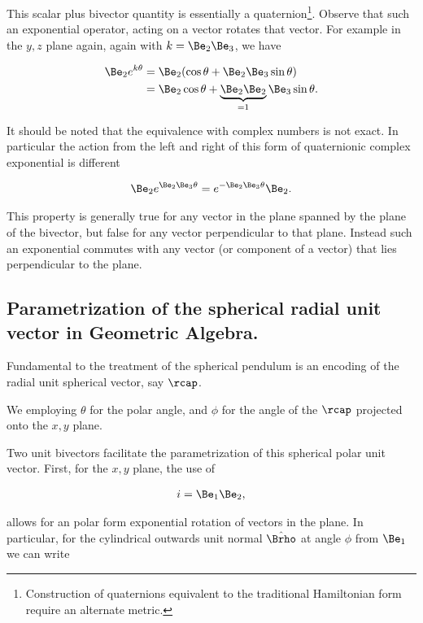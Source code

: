This scalar plus bivector quantity is essentially a quaternion\footnote{Construction of quaternions equivalent to the traditional Hamiltonian form require an alternate metric.}.  Observe that such an exponential operator, acting on a vector rotates that vector.  For example in the $y,z$ plane again, again with $k = \Be_2 \Be_3$, we have

\begin{align*}
\Be_2 e^{k \theta} 
&=
\Be_2 (\cos\theta + \Be_2 \Be_3 \sin\theta) \\
&=
\Be_2 \cos\theta + \underbrace{\Be_2 \Be_2}_{=1} \Be_3 \sin\theta.
\end{align*}

It should be noted that the equivalence with complex numbers is not exact.  In particular the action from the left and right of this form of quaternionic complex exponential is different

\begin{align}\label{eqn:mp40}
\Be_2 e^{\Be_2 \Be_3 \theta} = e^{-\Be_2 \Be_3 \theta} \Be_2.
\end{align}

This property is generally true for any vector in the plane spanned by the plane of the bivector, but false for any vector perpendicular to that plane.  Instead such an exponential commutes with any vector (or component of a vector) that lies perpendicular to the plane.

\subsection{Parametrization of the spherical radial unit vector in Geometric Algebra.}

Fundamental to the treatment of the spherical pendulum is an encoding of the radial unit spherical vector, say $\rcap$.

We employing $\theta$ for the polar angle, and $\phi$ for the angle of the $\rcap$ projected onto the $x,y$ plane.

Two unit bivectors facilitate the parametrization of this spherical polar unit vector.  First, for the $x,y$ plane, the use of

\begin{align}\label{eqn:mp50}
i = \Be_1 \Be_2,
\end{align}

allows for an polar form exponential rotation of vectors in the plane.  In particular, for the cylindrical outwards unit normal $\hat{\Brho}$ at angle $\phi$ from $\Be_1$ we can write


